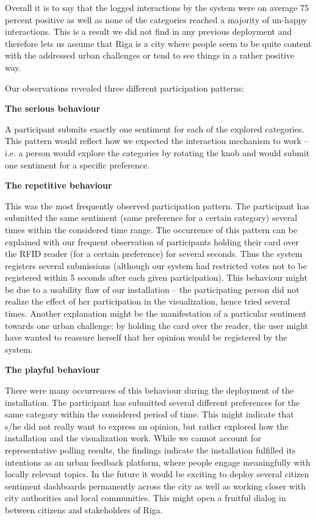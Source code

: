 Overall it is to say that the logged interactions by the system were on average 75 percent positive as well as none of the categories reached a majority of un-happy interactions. This is a result we did not find in any previous deployment and therefore lets us assume that Riga is a city where people seem to be quite content with the addressed urban challenges or tend to see things in a rather positive way.

Our observations revealed three different participation patterns:

\textbf{The serious behaviour}

A participant submits exactly one sentiment for each of the explored categories. 
This pattern would reflect how we expected the interaction mechanism to work – i.e. a person would explore the categories by rotating the knob and would submit one sentiment for a specific preference.

\textbf{The repetitive behaviour}

This was the most frequently observed participation pattern. The participant has submitted the same sentiment (same preference for a certain category) several times within the considered time range. The occurrence of this pattern can be explained with our frequent observation of participants holding their card over the RFID reader (for a certain preference) for several seconds. Thus the system registers several submissions (although our system had restricted votes not to be registered within 5 seconds after each given participation). This behaviour might be due to a usability flaw of our installation – the participating person did not realize the effect of her participation in the visualization, hence tried several times. Another explanation might be the manifestation of a particular sentiment towards one urban challenge: by holding the card over the reader, the user might have wanted to reassure herself that her opinion would be registered by the system.

\textbf{The playful behaviour}

There were many occurrences of this behaviour during the deployment of the installation. The participant has submitted several different preferences for the same category within the considered period of time. This might indicate that s/he did not really want to express an opinion, but rather explored how the installation and the visualization work. While we cannot account for representative polling results, the findings indicate the installation fulfilled its intentions as an urban feedback platform, where people engage meaningfully with locally relevant topics. In the future it would be exciting to deploy several citizen sentiment dashboards permanently across the city as well as working closer with city authorities and local communities. This might open a fruitful dialog in between citizens and stakeholders of Riga.

